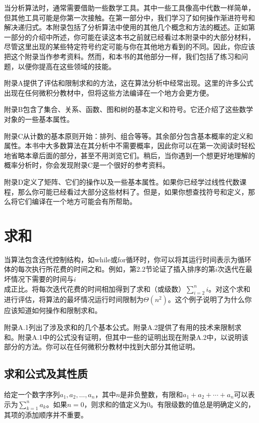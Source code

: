 \documentclass[lang=cn,newtx,10pt,scheme=chinese]{elegantbook}
\begin{document}
当分析算法时，通常需要借助一些数学工具。其中一些工具像高中代数一样简单，但其他工具可能是你第一次接触。在第一部分中，我们学习了如何操作渐进符号和解决递归式。本附录包括了分析算法中使用的其他几个概念和方法的概述。正如第一部分的介绍中所述，你可能在读这本书之前就已经看过本附录中的大部分材料，尽管这里出现的某些特定符号约定可能与你在其他地方看到的不同。因此，你应该把这个附录当作参考资料。然而，和本书的其他部分一样，我们包括了练习和问题，以便你提高在这些领域的技能。

附录A提供了评估和限制求和的方法，这在算法分析中经常出现。这里的许多公式出现在任何微积分教材中，但将这些方法编译在一个地方会更方便。

附录B包含了集合、关系、函数、图和树的基本定义和符号。它还介绍了这些数学对象的一些基本属性。

附录C从计数的基本原则开始：排列、组合等等。其余部分包含基本概率的定义和属性。本书中大多数算法在其分析中不需要概率，因此你可以在第一次阅读时轻松地省略本章后面的部分，甚至不用浏览它们。稍后，当你遇到一个想更好地理解的概率分析时，你会发现附录C是一个很好的参考资料。

附录D定义了矩阵、它们的操作以及一些基本属性。如果你已经学过线性代数课程，那么你可能已经看过大部分这些材料了。但是，如果你想查找符号和定义，那么将它们编译在一个地方可能会有所帮助。

\chapter{求和}

当算法包含迭代控制结构，如while或for循环时，你可以将其运行时间表示为循环体的每次执行所花费的时间之和。例如，第2.2节论证了插入排序的第$i$次迭代在最坏情况下需要的时间与$i$成正比。将每次迭代花费的时间相加得到了求和（或级数）$\sum_{i=2}^n i$。对这个求和进行评估，将算法的最坏情况运行时间限制为$\Theta\left(n^2\right)$。这个例子说明了为什么你应该知道如何操作和限制求和。

附录A.1列出了涉及求和的几个基本公式。附录A.2提供了有用的技术来限制求和。附录A.1中的公式没有证明，但其中一些的证明出现在附录A.2中，以说明该部分的方法。你可以在任何微积分教材中找到大部分其他证明。

\section{求和公式及其性质}\label{section:A.1}

给定一个数字序列$a_1,a_2,\ldots,a_n$，其中$n$是非负整数，有限和$a_1+a_2+\cdots+a_n$可以表示为$\sum_{k=1}^n a_k$。如果$n=0$，则求和的值定义为0。有限级数的值总是明确定义的，其项的添加顺序并不重要。
\end{document}
